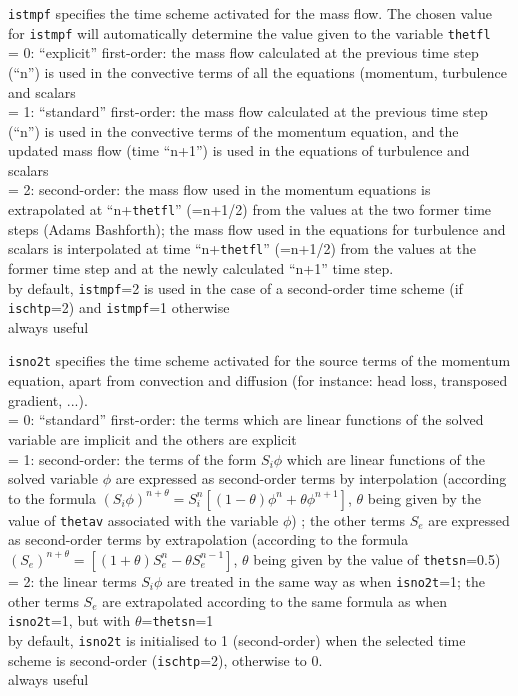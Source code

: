 {{\tt istmpf} specifies the time scheme activated
for the mass flow. The chosen value for {\tt istmpf} will automatically
determine the value given to the variable {\tt thetfl}\\
\hspace*{1.3cm}= 0: ``explicit'' first-order: the mass flow calculated
at the previous time step (``n'') is used in the convective terms of all
the equations (momentum, turbulence and scalars\\
\hspace*{1.3cm}= 1: ``standard'' first-order: the mass flow calculated
at the previous time step (``n'') is used in the convective terms of the
momentum equation, and the updated mass flow (time ``n+1'') is used in the
equations of turbulence and scalars\\
\hspace*{1.3cm}= 2: second-order: the mass flow used in the momentum equations
is extrapolated at ``n+{\tt thetfl}'' (=n+1/2) from the values at the two former time
steps (Adams Bashforth); the mass flow used in the equations for turbulence and
scalars is interpolated at time ``n+{\tt thetfl}'' (=n+1/2) from the values at the
former time step and at the newly calculated ``n+1'' time step.\\
by default, {\tt istmpf}=2 is used in the case of a second-order time
scheme (if {\tt ischtp}=2) and {\tt istmpf}=1 otherwise\\
always useful}

{{\tt isno2t} specifies the time scheme activated
for the source terms of the momentum equation, apart from convection and
diffusion (for instance: head loss, transposed gradient, ...).\\
\hspace*{1.3cm}= 0: ``standard'' first-order: the terms which are linear
functions of the solved variable are implicit and the others are explicit\\
\hspace*{1.3cm}= 1: second-order: the terms of the form $S_i\phi$ which are
linear functions of the solved variable
$\phi$ are expressed as second-order terms by interpolation (according
to the formula
$(S_i\phi)^{n+\theta}=S_i^n[(1-\theta)\phi^n+\theta\phi^{n+1}]$, $\theta$
being given by the value of {\tt thetav} associated with the variable $\phi$)
; the other terms $S_e$ are expressed as second-order terms by
extrapolation (according to the formula
$(S_e)^{n+\theta}=[(1+\theta)S_e^n-\theta S_e^{n-1}]$, $\theta$ being
given by the value of {\tt thetsn}=0.5)\\
\hspace*{1.3cm}= 2: the linear terms $S_i\phi$ are treated in the same
way as when {\tt isno2t}=1;
the other terms $S_e$ are extrapolated according to the same formula
as when {\tt isno2t}=1, but with $\theta$={\tt thetsn}=1\\
by default, {\tt isno2t} is initialised to 1 (second-order) when
the selected time scheme is second-order ({\tt ischtp}=2), otherwise to 0.\\
always useful}


